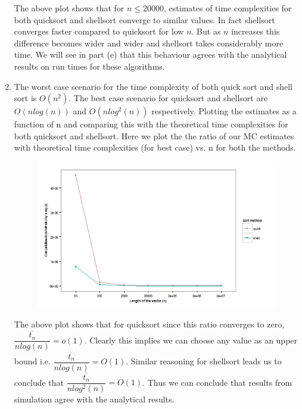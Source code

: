 \documentclass[12pt]{article}
\begin{document}
\begin{enumerate}[label=(\alph*)]
\begin{itemize}
\begin{figure}[H]
\begin{centering}
\caption{}
\end{centering}
\end{figure}
\end{itemize}
The above plot shows that for $n\leq20000$, estimates of time complexities for both quicksort and shellsort converge to similar values. In fact shellsort converges faster compared to quicksort for low $n$. But as $n$ increases this difference becomes wider and wider and shellsort takes considerably more time. We will see in part (e) that this behaviour agrees with the analytical results on run times for these algorithms. 

\item The worst case scenario for the time complexity of both quick sort and shell sort is $O(n^2)$. The best case scenario for quicksort and shellsort are $O(nlog(n))$ and $O(nlog^2(n))$ respectively. Plotting the estimates as a function of n and comparing this with the theoretical time complexities for both quicksort and shellsort. Here we plot the the ratio of our MC estimates with theoretical time complexities (for best case) vs. n for both the methods.
\begin{figure}[H]
\begin{centering}
\includegraphics[scale=0.6]{Fig7.jpeg}
\caption{}
\end{centering}
\end{figure}

The above plot shows that for quicksort since this ratio converges to zero, $\dfrac{\overline{t_n}}{nlog(n)}=o(1)$. Clearly this implies we can choose any value as an upper bound i.e. $\dfrac{\overline{t_n}}{nlog(n)}=O(1)$. Similar reasoning for shellsort leads us to conclude that $\dfrac{\overline{t_n}}{nlog^2(n)}=O(1)$. Thus we can conclude that results from simulation agree with the analytical results.

\end{enumerate}
\end{document}
